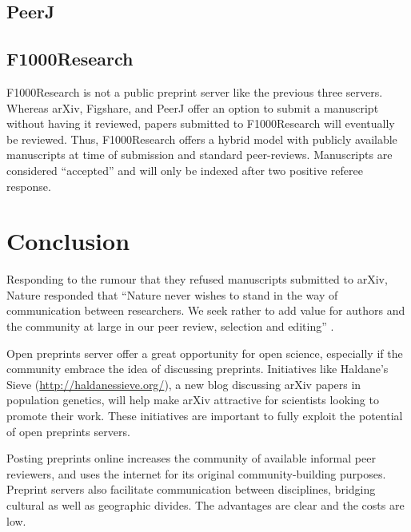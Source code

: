 \documentclass[letterpaper,twocolumn,superscriptaddress,showkeys]{revtex4}
\begin{document}
\subsection{PeerJ}


\subsection{F1000Research}


F1000Research is not a public preprint server like the previous three servers.
Whereas arXiv, Figshare, and PeerJ offer an option to submit a manuscript
without having it reviewed, papers submitted to F1000Research will eventually be
reviewed. Thus, F1000Research offers a hybrid model with publicly available
manuscripts at time of submission and standard peer-reviews. Manuscripts are
considered ``accepted'' and will only be indexed after two positive referee
response.

\section{Conclusion}

Responding to the rumour that they refused manuscripts submitted to arXiv,
Nature responded that ``Nature never wishes to stand in the way of communication
between researchers. We seek rather to add value for authors and the community
at large in our peer review, selection and editing'' \cite{nat05}.

Open preprints server offer a great opportunity for open science, especially if
the community embrace the idea of discussing preprints. Initiatives like
Haldane's Sieve (\href{http://haldanessieve.org/}{http://haldanessieve.org/}), a
new blog discussing arXiv papers in population genetics, will help make arXiv
attractive for scientists looking to promote their work. These initiatives are
important to fully exploit the potential of open preprints servers.

Posting preprints online increases the community of available informal peer
reviewers, and uses the internet for its original community-building purposes.
Preprint servers also facilitate communication between disciplines, bridging
cultural as well as geographic divides. The advantages are clear and the costs are low.


\newpage


\end{document}
